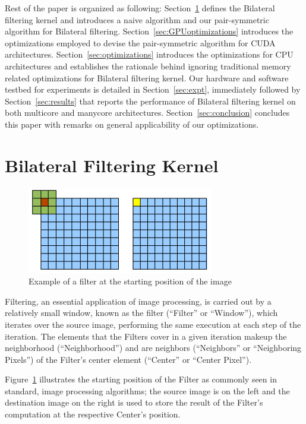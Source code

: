 \documentclass{IEEEtran}
\begin{document}
Rest of the paper is organized as following: Section~\ref{sec:stencil} defines the Bilateral filtering kernel and introduces a naive algorithm and our pair-symmetric algorithm for Bilateral filtering. Section~\ref{sec:GPUoptimizations} introduces the optimizations employed to devise the pair-symmetric algorithm for CUDA architectures. Section~\ref{sec:optimizations} introduces the optimizations for CPU architectures and establishes the rationale behind ignoring traditional memory related optimizations for Bilateral filtering kernel. Our hardware and software testbed for experiments is detailed in Section~\ref{sec:expt}, immediately followed by Section~\ref{sec:results} that reports the performance of Bilateral filtering kernel on both multicore and manycore architectures. Section~\ref{sec:conclusion} concludes this paper with remarks on general applicability of our optimizations.

\section{Bilateral Filtering Kernel}
\label{sec:stencil} 

\begin{figure}[h!]
\centering 
\includegraphics[width=3.2in]{images/filter} 
\caption{Example of a filter at the starting position of the image}
\label{fig:filter} 
\end{figure}

Filtering, an essential application of image processing, is carried out by a relatively small window, known as the filter (``Filter'' or ``Window''), which iterates over the source image, performing the same execution at each step of the iteration. The elements that the Filters cover in a given iteration makeup the neighborhood (``Neighborhood'') and are neighbors (``Neighbors'' or ``Neighboring Pixels'') of the Filter's center element (``Center'' or ``Center Pixel''). 

Figure~\ref{fig:filter} illustrates the starting position of the Filter as commonly seen in standard, image processing algorithms; the source image is on the left and the destination image on the right is used to store the result of the Filter's computation at the respective Center's position.
\end{document}
